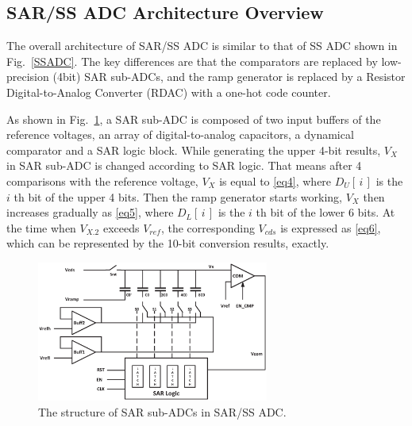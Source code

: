 \subsection{SAR/SS ADC Architecture Overview}\label{over2}

The overall architecture of SAR/SS ADC is similar to that of SS ADC shown in Fig.~\ref{SSADC}. The key differences are that the comparators are replaced by low-precision (4bit) SAR sub-ADCs, and
the ramp generator is replaced by a Resistor Digital-to-Analog Converter (RDAC) with a one-hot code counter.

As shown in Fig.~\ref{SAR}, a SAR sub-ADC is composed of two input buffers of the reference voltages, an array of digital-to-analog capacitors, a dynamical comparator and a SAR logic block. While generating the upper 4-bit results, $V_{X}$ in SAR sub-ADC is changed according to SAR logic. That means after 4 comparisons 
with the reference voltage, $V_{X}$ is equal to \eqref{eq4}, where $D_{U}\left[\,i\,\right]$ is the $i$ th bit of the upper 4 bits. 
Then the ramp generator starts working, $V_{X}$ then increases gradually as \eqref{eq5}, where $D_{L}\left[\,i\,\right]$ is the $i$ th bit of the lower 6 bits. 
At the time when $V_{X.2}$ exceeds $V_{ref}$, the corresponding $V_{cds}$ is expressed as \eqref{eq6}, which can be represented by the 10-bit conversion results, exactly.

\begin{figure}[htbp]
	\centerline{\includegraphics[width=3in]{./Figures/SAR.eps}}
	\caption{The structure of SAR sub-ADCs in SAR/SS ADC.}
	\label{SAR}
\end{figure}

